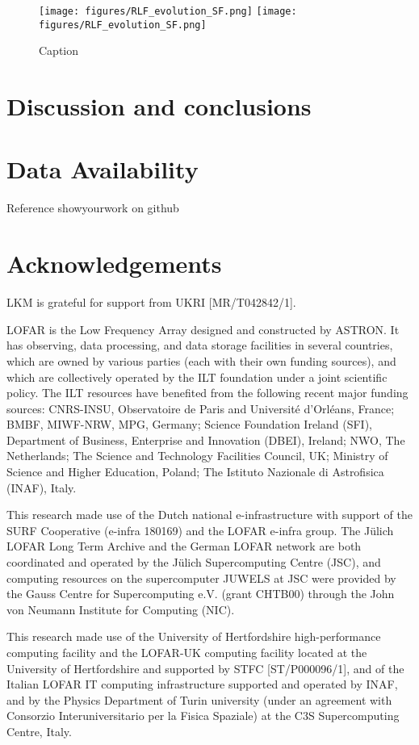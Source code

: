 \documentclass[usenatbib,fleqn,letters]{mnras}
\begin{document}
\begin{figure*}
    \centering
    \texttt{[image: figures/RLF\_evolution\_SF.png]}
    \texttt{[image: figures/RLF\_evolution\_SF.png]}
    \caption{Caption}
    \label{fig:sf_evolution}
\end{figure*}


\section{Discussion and conclusions}


\section*{Data Availability}
Reference showyourwork on github

\section*{Acknowledgements}
LKM is grateful for support from UKRI [MR/T042842/1]. 

LOFAR is the Low Frequency Array designed and constructed by ASTRON. It has observing, data processing, and data storage facilities in several countries, which are owned by various parties (each with their own funding sources), and which are collectively operated by the ILT foundation under a joint scientific policy. The ILT resources have benefited from the following recent major funding sources: CNRS-INSU, Observatoire de Paris and Université d'Orléans, France; BMBF, MIWF-NRW, MPG, Germany; Science Foundation Ireland (SFI), Department of Business, Enterprise and Innovation (DBEI), Ireland; NWO, The Netherlands; The Science and Technology Facilities Council, UK; Ministry of Science and Higher Education, Poland; The Istituto Nazionale di Astrofisica (INAF), Italy.

This research made use of the Dutch national e-infrastructure with support of the SURF Cooperative (e-infra 180169) and the LOFAR e-infra group. The Jülich LOFAR Long Term Archive and the German LOFAR network are both coordinated and operated by the Jülich Supercomputing Centre (JSC), and computing resources on the supercomputer JUWELS at JSC were provided by the Gauss Centre for Supercomputing e.V. (grant CHTB00) through the John von Neumann Institute for Computing (NIC).

This research made use of the University of Hertfordshire high-performance computing facility and the LOFAR-UK computing facility located at the University of Hertfordshire and supported by STFC [ST/P000096/1], and of the Italian LOFAR IT computing infrastructure supported and operated by INAF, and by the Physics Department of Turin university (under an agreement with Consorzio Interuniversitario per la Fisica Spaziale) at the C3S Supercomputing Centre, Italy.
\end{document}
